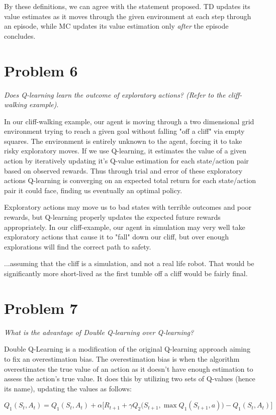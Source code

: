 \documentclass{article}
\begin{document}
By these definitions, we can agree with the statement proposed. TD updates its value estimates as it moves through the given environment at each step through an episode, while MC updates its value estimation only \textit{after} the episode concludes.

\section*{Problem 6}
\textit{Does Q-learning learn the outcome of exploratory actions? (Refer to the cliff-walking example)}.

In our cliff-walking example, our agent is moving through a two dimensional grid environment trying to reach a given goal without falling "off a cliff" via empty squares. The environment is entirely unknown to the agent, forcing it to take risky exploratory moves. If we use Q-learning, it estimates the value of a given action by iteratively updating it's Q-value estimation for each state/action pair based on observed rewards. Thus through trial and error of these exploratory actions Q-learning is converging on an expected total return for each state/action pair it could face, finding us eventually an optimal policy.

Exploratory actions may move us to bad states with terrible outcomes and poor rewards, but Q-learning properly updates the expected future rewards appropriately. In our cliff-example, our agent in simulation may very well take exploratory actions that cause it to "fall" down our cliff, but over enough explorations will find the correct path to safety.

...assuming that the cliff is a simulation, and not a real life robot. That would be significantly more short-lived as the first tumble off a cliff would be fairly final.


\section*{Problem 7}
\textit{What is the advantage of Double Q-learning over Q-learning?}

Double Q-Learning is a modification of the original Q-learning approach aiming to fix an overestimation bias. The overestimation bias is when the algorithm overestimates the true value of an action as it doesn't have enough estimation to assess the action's true value. It does this by utilizing two sets of Q-values (hence its name), updating the values as follows:

\begin{equation}
    Q_1(S_t, A_t) = Q_1(S_t, A_t) + \alpha \biggl[ R_{t+1} + \gamma Q_2 \bigl( S_{t+1}, \max Q_1(S_{t+1}, a) \bigr) - Q_1(S_t, A_t) \biggr]
    \end{equation}
    
\end{document}
